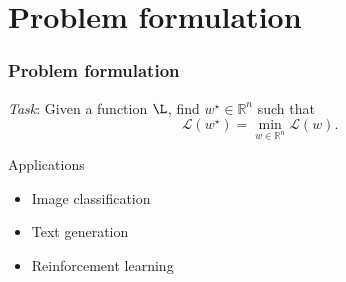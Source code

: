 \documentclass[17pt,institute=e10]{tuhh_presentation}
\newcommand{\R}{\mathbb{R}}
\newcommand{\CL}{\mathcal{L}}
\begin{document}











\begin{frame}[agenda]
  \tableofcontents
\end{frame}

\section{Problem formulation}

\begin{frame}
  \frametitle{Problem formulation}
  \emph{Task}: Given a function $\L$, find $w^\star \in \R^n$ such that
  \begin{equation*}
    \CL(w^\star) = \min_{w \in \R^n} \CL(w).
  \end{equation*}
  \begin{block}{Applications}
  \begin{itemize}
    \item Image classification
    \item Text generation
    \item Reinforcement learning
  \end{itemize}
  \end{block}
\end{frame}
\end{document}
